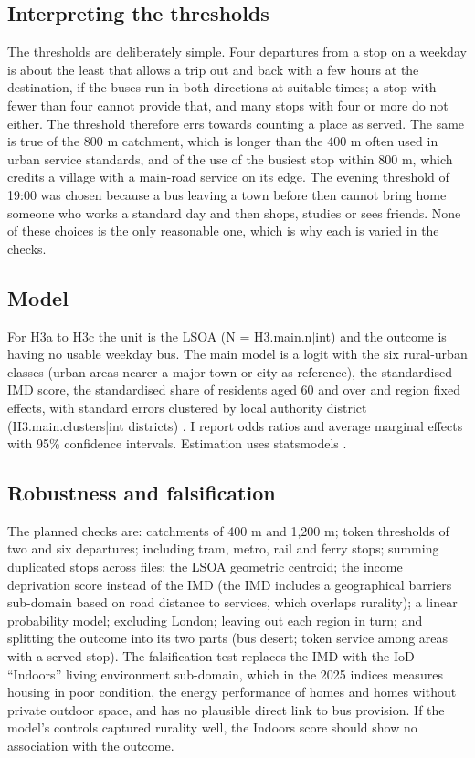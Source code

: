 \documentclass[11pt,a4paper]{article}
\begin{document}
\subsection{Interpreting the thresholds}
The thresholds are deliberately simple. Four departures from a stop on a weekday is about the least that allows a trip out and back with a few hours at the destination, if the buses run in both directions at suitable times; a stop with fewer than four cannot provide that, and many stops with four or more do not either. The threshold therefore errs towards counting a place as served. The same is true of the 800 m catchment, which is longer than the 400 m often used in urban service standards, and of the use of the busiest stop within 800 m, which credits a village with a main-road service on its edge. The evening threshold of 19:00 was chosen because a bus leaving a town before then cannot bring home someone who works a standard day and then shops, studies or sees friends. None of these choices is the only reasonable one, which is why each is varied in the checks.

\subsection{Model}
For H3a to H3c the unit is the LSOA (N = {{H3.main.n|int}}) and the outcome is having no usable weekday bus. The main model is a logit with the six rural-urban classes (urban areas nearer a major town or city as reference), the standardised IMD score, the standardised share of residents aged 60 and over and region fixed effects, with standard errors clustered by local authority district ({{H3.main.clusters|int}} districts) \citep{cameron2015}. I report odds ratios and average marginal effects with 95\% confidence intervals. Estimation uses statsmodels \citep{seabold2010}.

\subsection{Robustness and falsification}
The planned checks are: catchments of 400 m and 1,200 m; token thresholds of two and six departures; including tram, metro, rail and ferry stops; summing duplicated stops across files; the LSOA geometric centroid; the income deprivation score instead of the IMD (the IMD includes a geographical barriers sub-domain based on road distance to services, which overlaps rurality); a linear probability model; excluding London; leaving out each region in turn; and splitting the outcome into its two parts (bus desert; token service among areas with a served stop). The falsification test replaces the IMD with the IoD ``Indoors'' living environment sub-domain, which in the 2025 indices measures housing in poor condition, the energy performance of homes and homes without private outdoor space, and has no plausible direct link to bus provision. If the model's controls captured rurality well, the Indoors score should show no association with the outcome.
\end{document}
